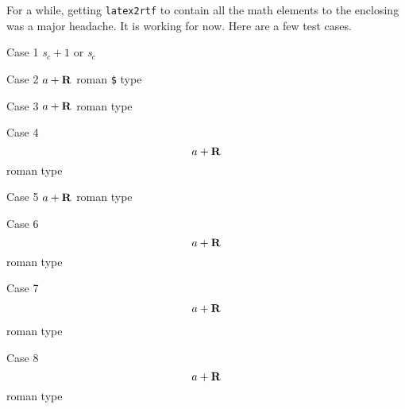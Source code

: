 \documentclass{article}
\begin{document}
For a while, getting \texttt{latex2rtf} to contain all the math elements
to the enclosing was a major headache.  It is working for now.  Here are
a few test cases.

Case 1 \textit{s$_c+1$} or {\it s$_c$}

Case 2 $a+\bf R$ roman \verb#$# type

Case 3 \(a+\bf R\) roman type

Case 4 \[a+\bf R\] roman type

Case 5 \begin{math}a+\bf R\end{math} roman type

Case 6 \begin{equation}a+ \bf R\end{equation} roman type

Case 7 \begin{eqnarray}a+ \bf R\end{eqnarray} roman type

Case 8 $$a+ \bf R$$ roman type
\end{document}
